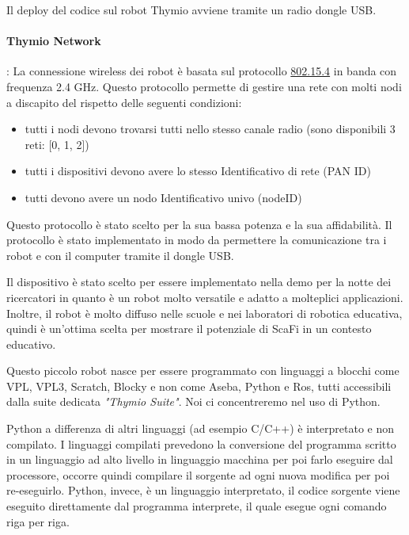 \documentclass[12pt,a4paper,openright,twoside]{book}
\begin{document}
Il deploy del codice sul robot Thymio avviene tramite un radio dongle USB.
\paragraph{Thymio Network}: La connessione wireless dei robot è basata sul protocollo \href{https://en.wikipedia.org/wiki/IEEE_802.15.4}{802.15.4} in banda con frequenza 2.4 GHz. Questo protocollo permette di gestire una rete con molti nodi a discapito del rispetto delle seguenti condizioni:

\begin{itemize}
    \item tutti i nodi devono trovarsi tutti nello stesso canale radio (sono disponibili 3 reti: [0, 1, 2])
    \item tutti i dispositivi devono avere lo stesso Identificativo di rete (PAN ID)
    \item tutti devono avere un nodo Identificativo univo (nodeID)
\end{itemize}

Questo protocollo è stato scelto per la sua bassa potenza e la sua affidabilità. Il protocollo è stato implementato in modo da permettere la comunicazione tra i robot e con il computer tramite il dongle USB.

Il dispositivo è stato scelto per essere implementato nella demo per la notte dei ricercatori in quanto è un robot molto versatile e adatto a molteplici applicazioni. Inoltre, il robot è molto diffuso nelle scuole e nei laboratori di robotica educativa, quindi è un'ottima scelta per mostrare il potenziale di ScaFi in un contesto educativo.

Questo piccolo robot nasce per essere programmato con linguaggi a blocchi come VPL, VPL3, Scratch, Blocky e non come Aseba, Python e Ros, tutti accessibili dalla suite dedicata \textit{"Thymio Suite"}.
Noi ci concentreremo nel uso di Python. 

Python a differenza di altri linguaggi (ad esempio C/C++) è interpretato e non compilato. I linguaggi compilati prevedono la conversione del programma scritto in un linguaggio ad alto livello in linguaggio macchina per poi farlo eseguire dal processore, occorre quindi compilare il sorgente ad ogni nuova modifica per poi re-eseguirlo. Python, invece, è un linguaggio interpretato, il codice sorgente viene eseguito direttamente dal programma interprete, il quale esegue ogni comando riga per riga.
\end{document}
